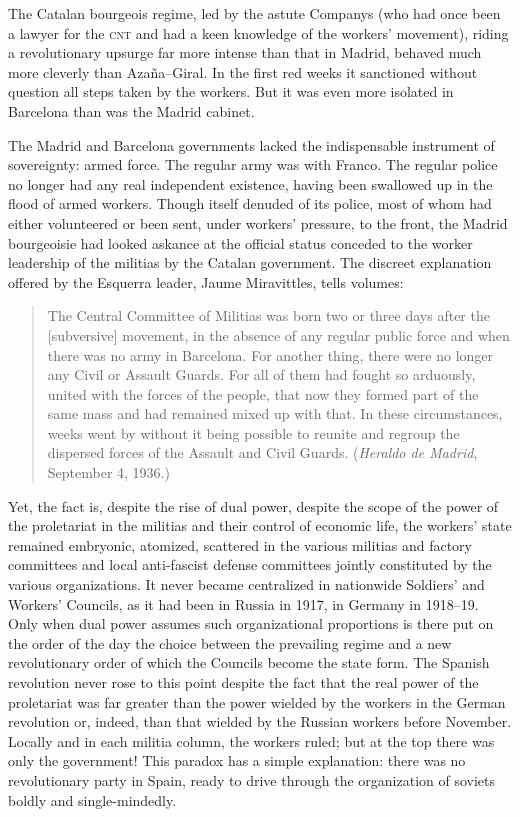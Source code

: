 The Catalan bourgeois regime, led by the astute Companys{\indexLCompanys} (who had once been a lawyer for the \textsc{cnt} and had a keen knowledge of the workers’ movement), riding a revolutionary upsurge far more intense than that in Madrid, behaved much more cleverly than Azaña--Giral. In the first red weeks it sanctioned without question all steps taken by the workers. But it was even more isolated in Barcelona than was the Madrid cabinet.

\indexEsquerra{}
The Madrid and Barcelona governments lacked the indispensable instrument of sovereignty: armed force. The regular army was with Franco. The regular police no longer had any real independent existence, having been swallowed up in the flood of armed workers. Though itself denuded of its police, most of whom had either volunteered or been sent, under workers’ pressure, to the front, the Madrid bourgeoisie had looked askance at the official status conceded to the worker leadership of the militias by the Catalan government. The discreet explanation offered by the Esquerra leader, Jaume Miravittles, tells volumes:

\begin{quotation}
  The Central Committee of Militias was born two or three days after the [subversive] movement, in the absence of any regular public force and when there was no army in Barcelona. For another thing, there were no longer any Civil or Assault Guards. For all of them had fought so arduously, united with the forces of the people, that now they formed part of the same mass and had remained mixed up with that. In these circumstances, weeks went by without it being possible to reunite and regroup the dispersed forces of the Assault and Civil Guards. (\emph{Heraldo de Madrid}, September 4, 1936.)
\end{quotation}

Yet, the fact is, despite the rise of dual power, despite the scope of the power of the proletariat in the militias and their control of economic life, the workers’ state remained embryonic, atomized, scattered in the various militias and factory committees and local anti-fascist defense committees jointly constituted by the various organizations. It never became centralized in nationwide Soldiers’ and Workers’ Councils, as it had been in Russia in 1917, in Germany in 1918–19. Only when dual power assumes such organizational proportions is there put on the order of the day the choice between the prevailing regime and a new revolutionary order of which the Councils become the state form. The Spanish revolution never rose to this point despite the fact that the real power of the proletariat was far greater than the power wielded by the workers in the German revolution or, indeed, than that wielded by the Russian workers before November. Locally and in each militia column, the workers ruled; but at the top there was only the government! This paradox has a simple explanation: there was no revolutionary party in Spain, ready to drive through the organization of soviets boldly and single-mindedly.

